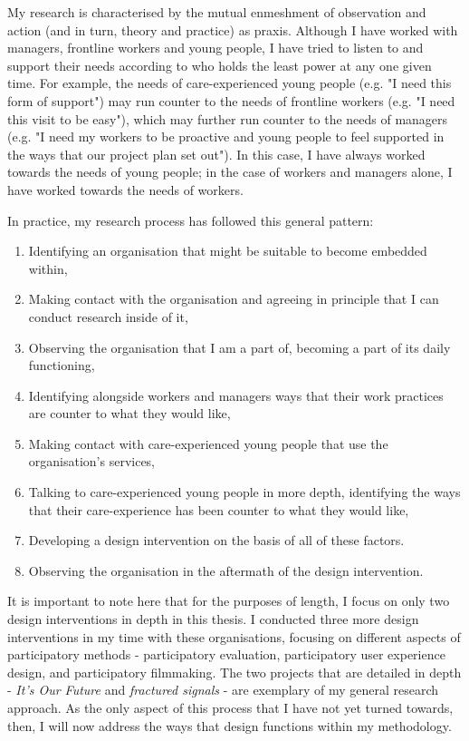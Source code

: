 My research is characterised by the mutual enmeshment of observation and action (and in turn, theory and practice) as praxis. Although I have worked with managers, frontline workers and young people, I have tried to listen to and support their needs according to who holds the least power at any one given time. For example, the needs of care-experienced young people (e.g. "I need this form of support") may run counter to the needs of frontline workers (e.g. "I need this visit to be easy"), which may further run counter to the needs of managers (e.g. "I need my workers to be proactive and young people to feel supported in the ways that our project plan set out"). In this case, I have always worked towards the needs of young people; in the case of workers and managers alone, I have worked towards the needs of workers. 

In practice, my research process has followed this general pattern:
\begin{enumerate}
\item Identifying an organisation that might be suitable to become embedded within,
\item Making contact with the organisation and agreeing in principle that I can conduct research inside of it,
\item Observing the organisation that I am a part of, becoming a part of its daily functioning,
\item Identifying alongside workers and managers ways that their work practices are counter to what they would like,
\item Making contact with care-experienced young people that use the organisation's services,
\item Talking to care-experienced young people in more depth, identifying the ways that their care-experience has been counter to what they would like,
\item Developing a design intervention on the basis of all of these factors.
\item Observing the organisation in the aftermath of the design intervention.
\end{enumerate}

It is important to note here that for the purposes of length, I focus on only two design interventions in depth in this thesis. I conducted three more design interventions in my time with these organisations, focusing on different aspects of participatory methods - participatory evaluation, participatory user experience design, and  participatory filmmaking. The two projects that are detailed in depth - \textit{It's Our Future} and \textit{fractured signals} - are exemplary of my general research approach. As the only aspect of this process that I have not yet turned towards, then, I will now address the ways that design functions within my methodology. 

